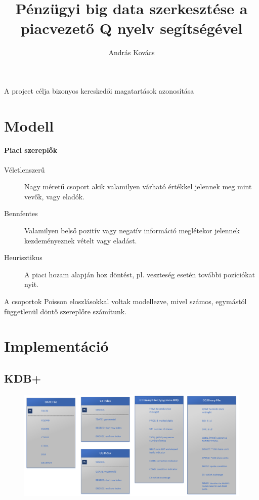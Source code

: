 \documentclass[]{article}
\title{Pénzügyi big data szerkesztése a piacvezető Q nyelv segítségével}
\author{András Kovács}
\begin{document}
\maketitle

\abstract

A project célja bizonyos kereskedői magatartások azonosítása

\section{Modell}


\paragraph{Piaci szereplők}

\begin{description}
	\item[Véletlenszerű] Nagy méretű csoport akik valamilyen várható értékkel jelennek meg mint vevők, vagy eladók. 
	\item[Bennfentes] Valamilyen belső pozitív vagy negatív információ meglétekor jelennek kezdeményeznek vételt vagy eladást.
	\item[Heurisztikus] A piaci hozam alapján hoz döntést, pl. veszteség esetén további pozíciókat nyit.
\end{description}

A csoportok Poisson eloszlásokkal voltak modellezve, mivel számos, egymástól függetlenül döntő szereplőre számítunk.

\section{Implementáció}


\subsection{KDB+}

\begin{figure}
\centering
\includegraphics[width=0.7\linewidth]{db1}
\caption[Adatbázis felépítése]{}
\label{fig:db1}
\end{figure}
\end{document}
